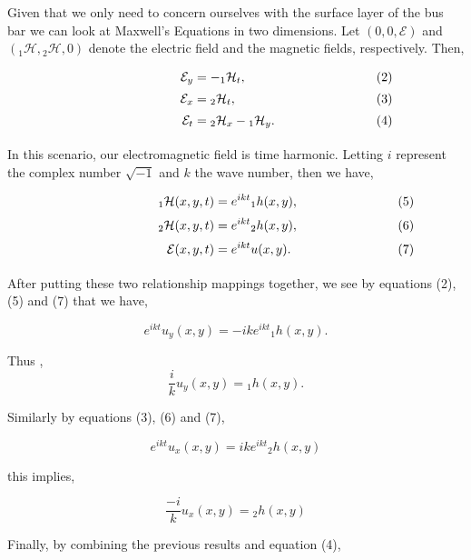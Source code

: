 \documentclass[11pt]{article}
\begin{document}
Given that we only need to concern ourselves with the surface layer of
the bus bar we can look at Maxwell's Equations in two dimensions. Let
$(0,0,\mathcal{E})$ and $({}_{1}\mathcal{H},{}_{2}\mathcal{H},0)$
denote the electric field and the magnetic fields, respectively. Then,

\begin{equation*}
    \begin{alignedat}{3}
        & \hskip8em & \mathcal E_{y}& = - {}_{1}\mathcal H_{t},  & \hskip8em &\text{(2)} \\[0.5ex]
        & \hskip8em & \mathcal E_{x}& = {}_{2}\mathcal H_{t},  & \hskip8em &\text{(3)} \\[0.5ex]
        & \hskip8em & \mathcal E_{t}& = {}_{2}\mathcal H_{x} - {}_{1}\mathcal H_{y}. & \hskip8em &\text{(4)}\\[0.5ex]
    \end{alignedat}
\end{equation*}

In this scenario, our electromagnetic field is time harmonic. Letting
\(i\) represent the complex number \(\sqrt{-1}\) and \(k\) the wave
number, then we have,

\begin{equation*}
    \begin{alignedat}{3}      
        & \hskip8em & _{1}\mathcal H(x,y,t)& = e^{ikt} {}_{1}h(x,y), &\hskip8em &\text{(5)} \\[0.5ex]
        & \hskip8em & _{2}\mathcal H(x,y,t)& = e^{ikt} {}_{2}h(x,y), &\hskip8em &\text{(6)} \\[0.5ex]
        & \hskip8em & \mathcal E(x,y,t)& = e^{ikt}u(x,y). &\hskip8em &\text{(7)} \\[0.5ex]
    \end{alignedat}
\end{equation*}

After putting these two relationship mappings together, we see by
equations (2), (5) and (7) that we have,

\[
e^{ikt}u_{y}(x,y) = -ike^{ikt}{}_{1}h(x,y).
\]

Thus ,
\[\frac{i}{k}u_{y}(x,y)={}_{1}h(x,y).\]

Similarly by equations (3), (6) and (7),

\[
e^{ikt}u_{x}(x,y) = ike^{ikt}{}_{2}h(x,y)
\]

this implies,

\[\frac{-i}{k}u_{x}(x,y)={}_{2}h(x,y)\]

Finally, by combining the previous results and equation (4),
\end{document}
